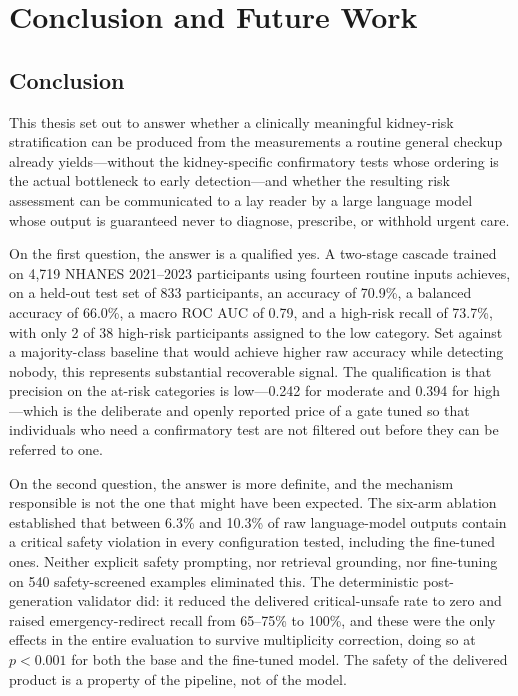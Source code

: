 \chapter{Conclusion and Future Work}
\label{ch:conclusion}

\section{Conclusion}
\label{sec:conclusion}

This thesis set out to answer whether a clinically meaningful kidney-risk
stratification can be produced from the measurements a routine general checkup
already yields---without the kidney-specific confirmatory tests whose ordering
is the actual bottleneck to early detection---and whether the resulting risk
assessment can be communicated to a lay reader by a large language model whose
output is guaranteed never to diagnose, prescribe, or withhold urgent care.

On the first question, the answer is a qualified yes. A two-stage cascade
trained on 4{,}719 NHANES 2021--2023 participants using fourteen routine inputs
achieves, on a held-out test set of 833 participants, an accuracy of 70.9\%, a
balanced accuracy of 66.0\%, a macro ROC AUC of 0.79, and a high-risk recall of
73.7\%, with only 2 of 38 high-risk participants assigned to the low category.
Set against a majority-class baseline that would achieve higher raw accuracy
while detecting nobody, this represents substantial recoverable signal. The
qualification is that precision on the at-risk categories is low---0.242 for
moderate and 0.394 for high---which is the deliberate and openly reported price
of a gate tuned so that individuals who need a confirmatory test are not
filtered out before they can be referred to one.

On the second question, the answer is more definite, and the mechanism
responsible is not the one that might have been expected. The six-arm ablation
established that between 6.3\% and 10.3\% of raw language-model outputs contain
a critical safety violation in every configuration tested, including the
fine-tuned ones. Neither explicit safety prompting, nor retrieval grounding, nor
fine-tuning on 540 safety-screened examples eliminated this. The deterministic
post-generation validator did: it reduced the delivered critical-unsafe rate to
zero and raised emergency-redirect recall from 65--75\% to 100\%, and these were
the only effects in the entire evaluation to survive multiplicity correction,
doing so at $p<0.001$ for both the base and the fine-tuned model. The safety of
the delivered product is a property of the pipeline, not of the model.

